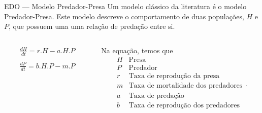 \begin{frame}{EDO — Modelo Predador-Presa}
    Um modelo clássico da literatura é o modelo Predador-Presa. Este modelo descreve o comportamento de duas populações, $H$ e $P$, que possuem uma uma relação de predação entre si. 

    \begin{columns}
        \begin{column}{.3\textwidth}
            \begin{equation}\label{eq:predadorpresa}
                \begin{array}{lr}
                    \frac{dH}{dt} = r.H - a.H.P
                    \\
                    \\
                    \frac{dP}{dt} = b.H.P - m.P
                \end{array}
            \end{equation}
        \end{column}
        \begin{column}{.6\textwidth}
            Na equação, temos que
            \[
            \begin{array}{lr}
                H & \text{Presa}\\
                P & \text{Predador}\\
                r & \text{Taxa de reprodução da presa}\\
                m & \text{Taxa de mortalidade dos predadores}\\
                a & \text{Taxa de predação}\\
                b & \text{Taxa de reprodução dos predadores}\\
                \end{array}.
            \]
        \end{column}
    \end{columns}

\end{frame}

